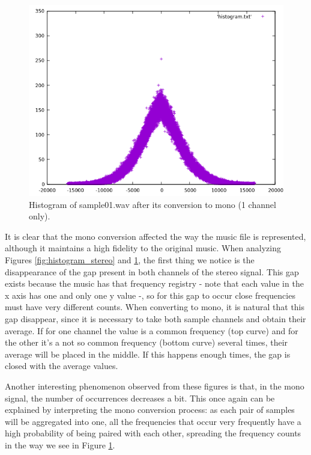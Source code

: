 \documentclass[12pt]{article}
\begin{document}
\begin{figure}[H]
  \centering
  \begin{minipage}{.5\textwidth}
    \centering
    \includegraphics[width=\linewidth]{sample01_16_1.png}
  \end{minipage}%
  \caption{Histogram of sample01.wav after its conversion to mono (1 channel only).}
  \label{fig:histogram_mono}
\end{figure}

It is clear that the mono conversion affected the way the music file is 
represented, although it maintains a high fidelity to the original music. 
When analyzing Figures \ref{fig:histogram_stereo} and \ref{fig:histogram_mono}, 
the first thing we notice is the disappearance of the gap present in both 
channels of the stereo signal. 
This gap exists because the music has that frequency registry - note that each 
value in the x axis has one and only one y value -, so for this gap to occur 
close frequencies must have very different counts. 
When converting to mono, it is natural that this gap disappear, since it is 
necessary to take both sample channels and obtain their average.
If for one channel the value is a common frequency (top curve) and for the other it's a not so common frequency (bottom curve) several times, their average will be placed in the middle.
If this happens enough times, the gap is closed with the average values. 

\newpage
Another interesting phenomenon observed from these figures is that, in the mono 
signal, the number of occurrences decreases a bit. 
This once again can be explained by interpreting the mono conversion process: 
as each pair of samples will be aggregated into one, all the frequencies that 
occur very frequently have a high probability of being paired with each other, 
spreading the frequency counts in the way we see in Figure \ref{fig:histogram_mono}.
\end{document}
